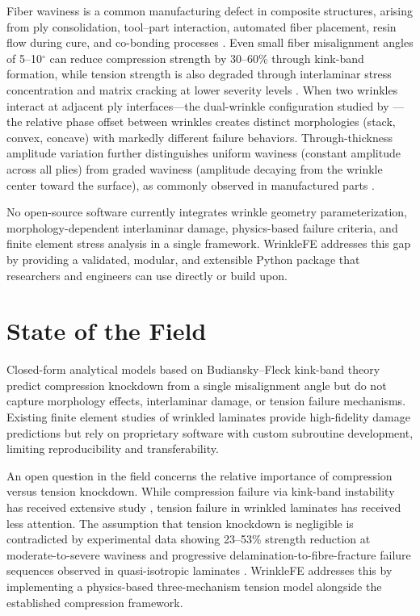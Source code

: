 \documentclass[10pt,a4paper]{article}
\begin{document}
Fiber waviness is a common manufacturing defect in composite structures, arising from ply consolidation, tool--part interaction, automated fiber placement, resin flow during cure, and co-bonding processes \citep{Wisnom1990,EllHajjar2023}.
Even small fiber misalignment angles of 5--10$^\circ$ can reduce compression strength by 30--60\% through kink-band formation, while tension strength is also degraded through interlaminar stress concentration and matrix cracking at lower severity levels \citep{Hsiao1996,Elhajjar2025,Mukhopadhyay2015}.
When two wrinkles interact at adjacent ply interfaces---the dual-wrinkle configuration studied by \citet{Jin2026}---the relative phase offset between wrinkles creates distinct morphologies (stack, convex, concave) with markedly different failure behaviors.
Through-thickness amplitude variation further distinguishes uniform waviness (constant amplitude across all plies) from graded waviness (amplitude decaying from the wrinkle center toward the surface), as commonly observed in manufactured parts \citep{EllHajjar2023}.

No open-source software currently integrates wrinkle geometry parameterization, morphology-dependent interlaminar damage, physics-based failure criteria, and finite element stress analysis in a single framework.
WrinkleFE addresses this gap by providing a validated, modular, and extensible Python package that researchers and engineers can use directly or build upon.

\section*{State of the Field}

Closed-form analytical models based on Budiansky--Fleck kink-band theory \citep{BudianskyFleck1993} predict compression knockdown from a single misalignment angle but do not capture morphology effects, interlaminar damage, or tension failure mechanisms.
Existing finite element studies of wrinkled laminates \citep{Jin2026,Mukhopadhyay2015} provide high-fidelity damage predictions but rely on proprietary software with custom subroutine development, limiting reproducibility and transferability.

An open question in the field concerns the relative importance of compression versus tension knockdown.
While compression failure via kink-band instability has received extensive study \citep{BudianskyFleck1993,Fleck1997,Pimenta2015,Hsiao1996}, tension failure in wrinkled laminates has received less attention.
The assumption that tension knockdown is negligible is contradicted by experimental data showing 23--53\% strength reduction at moderate-to-severe waviness \citep{Elhajjar2025} and progressive delamination-to-fibre-fracture failure sequences observed in quasi-isotropic laminates \citep{Mukhopadhyay2015}.
WrinkleFE addresses this by implementing a physics-based three-mechanism tension model alongside the established compression framework.
\end{document}
